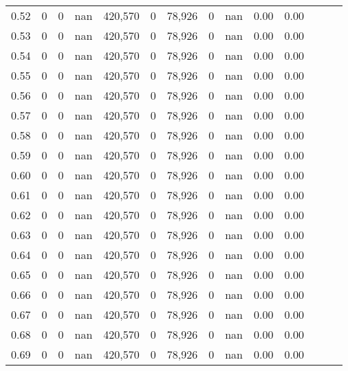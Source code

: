 \begin{tabular}{rrrrrrrrrrrrrr}
0.52 &       0 &      0 &   nan &  420,570 &        0 &  78,926 &       0 &   nan &  0.00 &      0.00 \\
0.53 &       0 &      0 &   nan &  420,570 &        0 &  78,926 &       0 &   nan &  0.00 &      0.00 \\
0.54 &       0 &      0 &   nan &  420,570 &        0 &  78,926 &       0 &   nan &  0.00 &      0.00 \\
0.55 &       0 &      0 &   nan &  420,570 &        0 &  78,926 &       0 &   nan &  0.00 &      0.00 \\
0.56 &       0 &      0 &   nan &  420,570 &        0 &  78,926 &       0 &   nan &  0.00 &      0.00 \\
0.57 &       0 &      0 &   nan &  420,570 &        0 &  78,926 &       0 &   nan &  0.00 &      0.00 \\
0.58 &       0 &      0 &   nan &  420,570 &        0 &  78,926 &       0 &   nan &  0.00 &      0.00 \\
0.59 &       0 &      0 &   nan &  420,570 &        0 &  78,926 &       0 &   nan &  0.00 &      0.00 \\
0.60 &       0 &      0 &   nan &  420,570 &        0 &  78,926 &       0 &   nan &  0.00 &      0.00 \\
0.61 &       0 &      0 &   nan &  420,570 &        0 &  78,926 &       0 &   nan &  0.00 &      0.00 \\
0.62 &       0 &      0 &   nan &  420,570 &        0 &  78,926 &       0 &   nan &  0.00 &      0.00 \\
0.63 &       0 &      0 &   nan &  420,570 &        0 &  78,926 &       0 &   nan &  0.00 &      0.00 \\
0.64 &       0 &      0 &   nan &  420,570 &        0 &  78,926 &       0 &   nan &  0.00 &      0.00 \\
0.65 &       0 &      0 &   nan &  420,570 &        0 &  78,926 &       0 &   nan &  0.00 &      0.00 \\
0.66 &       0 &      0 &   nan &  420,570 &        0 &  78,926 &       0 &   nan &  0.00 &      0.00 \\
0.67 &       0 &      0 &   nan &  420,570 &        0 &  78,926 &       0 &   nan &  0.00 &      0.00 \\
0.68 &       0 &      0 &   nan &  420,570 &        0 &  78,926 &       0 &   nan &  0.00 &      0.00 \\
0.69 &       0 &      0 &   nan &  420,570 &        0 &  78,926 &       0 &   nan &  0.00 &      0.00 \\

\end{tabular}
